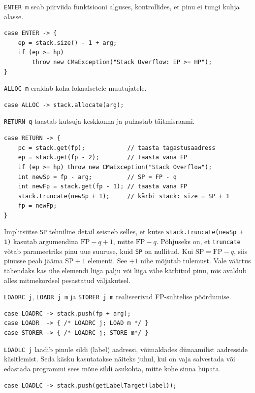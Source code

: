 \texttt{ENTER m} seab piirviida funktsiooni alguses, kontrollides, et pinu ei tungi kuhja alasse.
\begin{verbatim}
case ENTER -> {
    ep = stack.size() - 1 + arg;
    if (ep >= hp)
        throw new CMaException("Stack Overflow: EP >= HP");
}
\end{verbatim}

\texttt{ALLOC m} eraldab koha lokaalsetele muutujatele.
\begin{verbatim}
case ALLOC -> stack.allocate(arg);
\end{verbatim}

\texttt{RETURN q} taastab kutsuja keskkonna ja puhastab täitmisraami.
\begin{verbatim}
case RETURN -> {
    pc = stack.get(fp);            // taasta tagastusaadress
    ep = stack.get(fp - 2);        // taasta vana EP
    if (ep >= hp) throw new CMaException("Stack Overflow");
    int newSp = fp - arg;          // SP = FP - q
    int newFp = stack.get(fp - 1); // taasta vana FP
    stack.truncate(newSp + 1);     // kärbi stack: size = SP + 1
    fp = newFp;
}
\end{verbatim}

Implitsiitse \texttt{SP} tehniline detail seisneb selles, et kutse \texttt{stack.truncate(newSp + 1)} kasutab argumendina $\text{FP} - q + 1$, mitte $\text{FP} - q$. Põhjuseks on, et \texttt{truncate} võtab parameetriks pinu uue suuruse, kuid \texttt{SP} on nullitud. Kui $\text{SP} = \text{FP} - q$, siis pinusse peab jääma $\text{SP} + 1$ elementi. See $+1$ nihe mõjutab tulemust. Vale väärtus tähendaks kas ühe elemendi liiga palju või liiga vähe kärbitud pinu, mis avaldub alles mitmekordsel pesastatud väljakutsel.

\texttt{LOADRC j}, \texttt{LOADR j m} ja \texttt{STORER j m} realiseerivad FP-suhtelise pöördumise.
\begin{verbatim}
case LOADRC -> stack.push(fp + arg);
case LOADR  -> { /* LOADRC j; LOAD m */ }
case STORER -> { /* LOADRC j; STORE m*/ }
\end{verbatim}

\texttt{LOADLC j} laadib pinule sildi (label) aadressi, võimaldades dünaamilist aadresside käsitlemist. Seda käsku kasutatakse näiteks juhul, kui on vaja salvestada või edastada programmi sees mõne sildi asukohta, mitte kohe sinna hüpata.
\begin{verbatim}
case LOADLC -> stack.push(getLabelTarget(label));
\end{verbatim}

